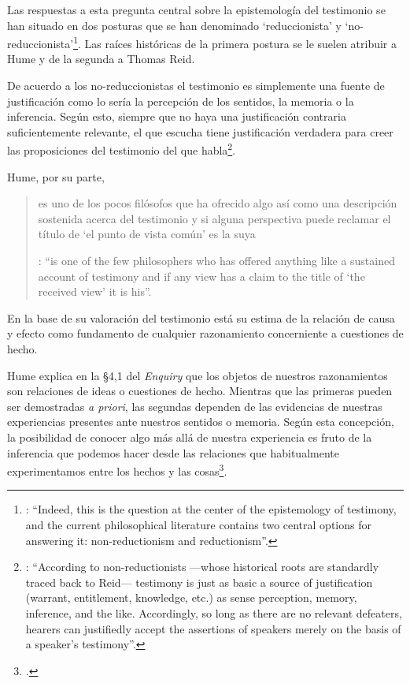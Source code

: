 Las respuestas a esta pregunta central sobre la epistemología del testimonio se han situado en dos posturas que se han denominado `reduccionista' y `no-reduccionista'\footnote{\cite[Cf.][4]{lackeysosa2006eptest}: \enquote{Indeed, this is the question at the center of the epistemology of testimony, and the current philosophical literature contains two central options for answering it: non-reductionism and reductionism}.}. Las raíces históricas de la primera postura se le suelen atribuir a Hume y de la segunda a Thomas Reid.

De acuerdo a los no-reduccionistas el testimonio es simplemente una fuente de justificación como lo sería la percepción de los sentidos, la memoria o la inferencia. Según esto, siempre que no haya una justificación contraria suficientemente relevante, el que escucha tiene justificación verdadera para creer las proposiciones del testimonio del que habla\footnote{\cite[Cf.][4]{lackeysosa2006eptest}: \enquote{According to non-reductionists ---whose historical roots are standardly traced back to Reid--- testimony is just as basic a source of justification (warrant, entitlement, knowledge, etc.) as sense perception, memory, inference, and the like. Accordingly, so long as there are no relevant defeaters, hearers can justifiedly accept the assertions of speakers merely on the basis of a speaker's testimony}.}.

Hume, por su parte, \blockquote[{\Cite[79]{coady1992test}}: \enquote{is one of the few philosophers who has offered anything like a sustained account of testimony and if any view has a claim to the title of `the received view' it is his}.]{es uno de los pocos filósofos que ha ofrecido algo así como una descripción sostenida acerca del testimonio y si alguna perspectiva puede reclamar el título de `el punto de vista común' es la suya}. En la base de su valoración del testimonio está su estima de la relación de causa y efecto como fundamento de cualquier razonamiento concerniente a cuestiones de hecho.

Hume explica en la \S4,1 del \emph{Enquiry} que los objetos de nuestros razonamientos son relaciones de ideas o cuestiones de hecho. Mientras que las primeras pueden ser demostradas \emph{a priori}, las segundas dependen de las evidencias de nuestras experiencias presentes ante nuestros sentidos o memoria. Según esta concepción, la posibilidad de conocer algo más allá de nuestra experiencia es fruto de la inferencia que podemos hacer desde las relaciones que habitualmente experimentamos entre los hechos y las cosas\footnote{\cite[Cf.][\S4, 1. 47-54]{hume1777enquiryes}.}.

